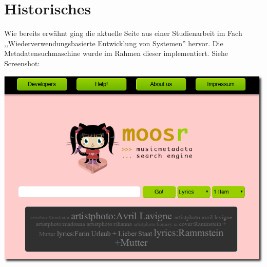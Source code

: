 \section{Historisches}
 
Wie bereits erwähnt ging die aktuelle Seite aus einer Studienarbeit im Fach 
,,Wiederverwendungsbasierte Entwicklung von Systemen'' hervor. Die
Metadatensuchmaschine wurde im Rahmen dieser implementiert. Siehe Screenshot:

\begin{center}
\includegraphics[scale=0.5]{../screenshots/old_site.png}
\end{center}
